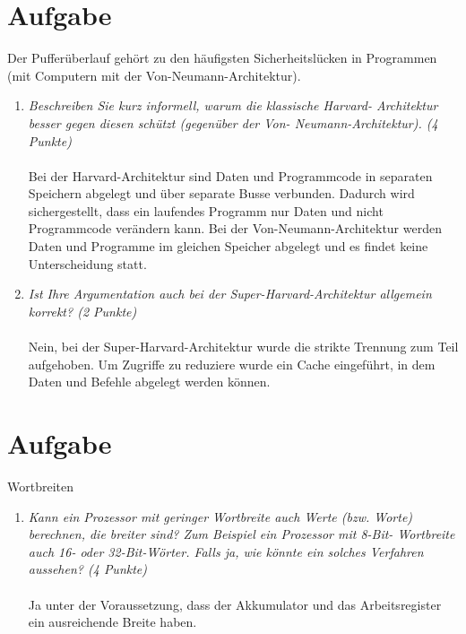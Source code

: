\documentclass[10pt]{article}
\begin{document}
\section{Aufgabe}
Der Pufferüberlauf gehört zu den häufigsten Sicherheitslücken in Programmen (mit Computern mit der Von-Neumann-Architektur).
\begin{enumerate}[label=\alph*)]
	\item 
	\textit{Beschreiben Sie kurz informell, warum die klassische Harvard- Architektur besser gegen diesen schützt (gegenüber der Von- Neumann-Architektur). (4 Punkte)} \\
	\\	
	Bei der Harvard-Architektur sind Daten und Programmcode in separaten Speichern abgelegt und über separate Busse verbunden. Dadurch wird sichergestellt, dass ein laufendes Programm nur Daten und nicht Programmcode verändern kann. Bei der Von-Neumann-Architektur werden Daten und Programme im gleichen Speicher abgelegt und es findet keine Unterscheidung statt.
	\item
	\textit{Ist Ihre Argumentation auch bei der Super-Harvard-Architektur allgemein korrekt? (2 Punkte)} \\
	\\
	Nein, bei der Super-Harvard-Architektur wurde die strikte Trennung zum Teil aufgehoben. Um Zugriffe zu reduziere wurde ein Cache eingeführt, in dem
	Daten und Befehle abgelegt werden können.
	
\end{enumerate}


\section{Aufgabe}
Wortbreiten
\begin{enumerate}[label=\alph*)]
	\item 
	\textit{Kann ein Prozessor mit geringer Wortbreite auch Werte (bzw. Worte) berechnen, die breiter sind? Zum Beispiel ein Prozessor mit 8-Bit- Wortbreite auch 16- oder 32-Bit-Wörter. Falls ja, wie könnte ein solches Verfahren aussehen? (4 Punkte)} \\
	\\
	Ja unter der Voraussetzung, dass der Akkumulator und das Arbeitsregister ein ausreichende Breite haben.
\end{enumerate}
\newpage

\end{document}
